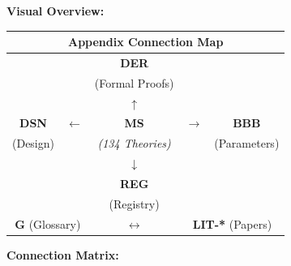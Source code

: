 \begin{tcolorbox}[colback=blue!3!white, colframe=blue!60!black,
    title=\textbf{Connection Architecture: MS $\leftrightarrow$ Other Appendices}]

\textbf{Visual Overview:}

\begin{center}
\begin{tabular}{|c|c|c|c|c|}
\hline
\multicolumn{5}{|c|}{\textbf{Appendix Connection Map}} \\
\hline
& & \textbf{DER} & & \\
& & (Formal Proofs) & & \\
& & $\uparrow$ & & \\
\hline
\textbf{DSN} & $\longleftarrow$ & \textbf{MS} & $\longrightarrow$ & \textbf{BBB} \\
(Design) & & \textit{(134 Theories)} & & (Parameters) \\
\hline
& & $\downarrow$ & & \\
& & \textbf{REG} & & \\
& & (Registry) & & \\
\hline
\multicolumn{2}{|c|}{\textbf{G} (Glossary)} & $\leftrightarrow$ & \multicolumn{2}{c|}{\textbf{LIT-*} (Papers)} \\
\hline
\end{tabular}
\end{center}

\vspace{0.5em}

\textbf{Connection Matrix:}


\end{tcolorbox}
